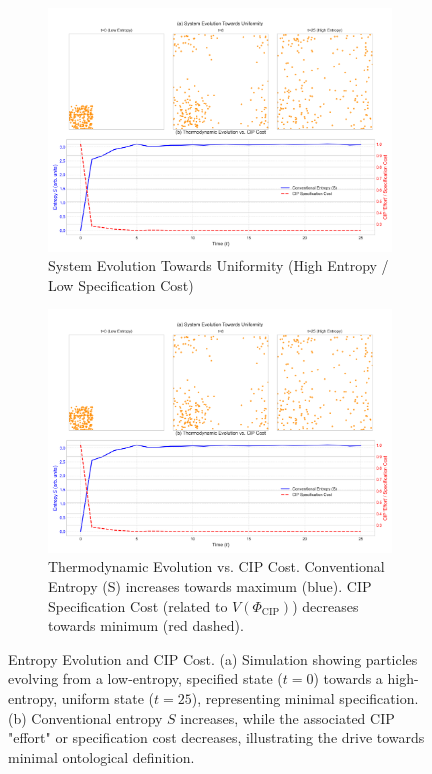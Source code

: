 \documentclass[11pt, a4paper]{article}
\newcommand{\subt}[1]{\mathrm{#1}}
\begin{document}
\begin{figure}[H]
    \centering
    \begin{subfigure}[b]{0.9\textwidth}
        \centering
        \includegraphics[width=\textwidth]{CIP_EntropyTime.png} %
        \caption{System Evolution Towards Uniformity (High Entropy / Low Specification Cost)}
        \label{fig:entropy_time_a}
    \end{subfigure}
    \vfill
    \begin{subfigure}[b]{0.9\textwidth}
        \centering
        \includegraphics[width=\textwidth]{CIP_EntropyTime.png} %
        \caption{Thermodynamic Evolution vs. CIP Cost. Conventional Entropy (S) increases towards maximum (blue). CIP Specification Cost (related to $V(\Phi_{\subt{CIP}})$) decreases towards minimum (red dashed).}
        \label{fig:entropy_time_b}
    \end{subfigure}
    \caption[Entropy Evolution and CIP Cost]{Entropy Evolution and CIP Cost. (a) Simulation showing particles evolving from a low-entropy, specified state ($t=0$) towards a high-entropy, uniform state ($t=25$), representing minimal specification. (b) Conventional entropy $S$ increases, while the associated CIP "effort" or specification cost decreases, illustrating the drive towards minimal ontological definition.}
    \label{fig:entropy_time}
\end{figure}
\end{document}
